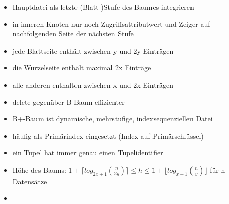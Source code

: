 \documentclass{scrartcl}
\begin{document}
\begin{itemize}
	\itemsep0em
	\item Hauptdatei als letzte (Blatt-)Stufe des Baumes integrieren
	\item in inneren Knoten nur noch Zugriffsattributwert und Zeiger auf nachfolgenden Seite der nächsten Stufe
	\item jede Blattseite enthält zwischen y und 2y Einträgen
	\item die Wurzelseite enthält maximal 2x Einträge
	\item alle anderen enthalten zwischen x und 2x Einträgen
	\item delete gegenüber B-Baum effizienter
	\item B+-Baum ist dynamische, mehrstufige, indexsequenziellen Datei
	\item häufig als Primärindex eingesetzt (Index auf Primärschlüssel)
	\item ein Tupel hat immer genau einen Tupelidentifier
	\item Höhe des Baums: $1+\lceil log_{2x+1}(\frac{n}{2y})\rceil \leq h \leq 1+\lfloor log_{x+1}(\frac{n}{y})\rfloor$ für n Datensätze
	\item[] %
\end{itemize}
\end{document}
